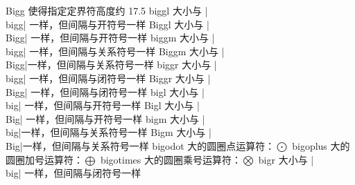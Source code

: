 \capcs Bigg {使得指定定界符高度约 17.5\pt}{}{}
\capcs biggl {大小与 |\\bigg| 一样，但间隔与开符号一样}{}{}
\capcs Biggl {大小与 |\\Bigg| 一样，但间隔与开符号一样}{}{}
\capcs biggm {大小与 |\\bigg| 一样，但间隔与关系符号一样}{}{}
\capcs Biggm {大小与 |\\Bigg|一样，但间隔与关系符号一样}{}{}
\capcs biggr {大小与 |\\bigg| 一样，但间隔与闭符号一样}{}{}
\capcs Biggr {大小与 |\\Bigg| 一样，但间隔与闭符号一样}{}{}
\capcs bigl {大小与 |\\big| 一样，但间隔与开符号一样}{}{}
\capcs Bigl {大小与 |\\Big| 一样，但间隔与开符号一样}{}{}
\capcs bigm {大小与 |\\big|一样，但间隔与关系符号一样}{}{}
\capcs Bigm {大小与 |\\Big|一样，但间隔与关系符号一样}{}{}
\capcs bigodot {大的圆圈点运算符：$\bigodot$}{}{}
\capcs bigoplus {大的圆圈加号运算符：$\bigoplus$}{}{}
\capcs bigotimes {大的圆圈乘号运算符：$\bigotimes$}{}{}
\capcs bigr {大小与 |\\big| 一样，但间隔与闭符号一样}{}{}
